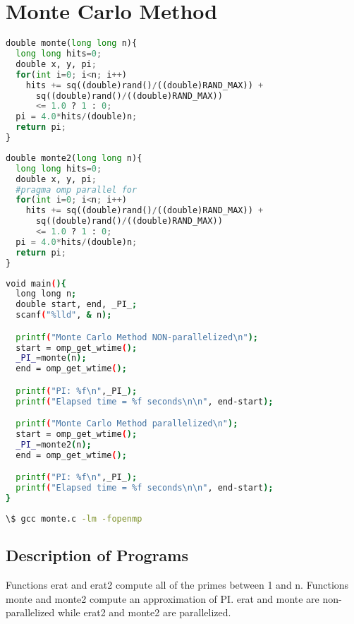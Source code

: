 \documentclass[12pt]{article}
\begin{document}
\section*{Monte Carlo Method}
\begin{lstlisting}[frame=single,language=Python,caption=Non-parallelized Monte Carlo Method (monte.c) \label{code:monte-carlo-nonparallelized}]
double monte(long long n){
  long long hits=0; 
  double x, y, pi;
  for(int i=0; i<n; i++)
    hits += sq((double)rand()/((double)RAND_MAX)) + 
      sq((double)rand()/((double)RAND_MAX)) 
      <= 1.0 ? 1 : 0;
  pi = 4.0*hits/(double)n;
  return pi;
}
\end{lstlisting}
\begin{lstlisting}[frame=single,language=Python,caption=Parallelized Monte Carlo Method (monte.c) \label{code:monte-carlo-parallelized}]
double monte2(long long n){
  long long hits=0; 
  double x, y, pi;
  #pragma omp parallel for
  for(int i=0; i<n; i++)
    hits += sq((double)rand()/((double)RAND_MAX)) + 
      sq((double)rand()/((double)RAND_MAX)) 
      <= 1.0 ? 1 : 0;
  pi = 4.0*hits/(double)n;
  return pi;
}
\end{lstlisting}
\newpage
\begin{lstlisting}[frame=single,language=Bash,caption=Measuring Runtime Performance (monte.c) \label{code:monte-carlo-runtime}]
void main(){
  long long n;
  double start, end, _PI_;
  scanf("%lld", & n);

  printf("Monte Carlo Method NON-parallelized\n");
  start = omp_get_wtime();
  _PI_=monte(n);
  end = omp_get_wtime();

  printf("PI: %f\n",_PI_);
  printf("Elapsed time = %f seconds\n\n", end-start);

  printf("Monte Carlo Method parallelized\n");
  start = omp_get_wtime();
  _PI_=monte2(n);
  end = omp_get_wtime();

  printf("PI: %f\n",_PI_);
  printf("Elapsed time = %f seconds\n\n", end-start);
}
\end{lstlisting}
\begin{lstlisting}[frame=single,language=Bash,caption=Output in Terminal (monte.c) \label{code:monte-carlo-terminal-output}]
\$ gcc monte.c -lm -fopenmp
\end{lstlisting}

\newpage
\subsection*{Description of Programs}
Functions erat and erat2 compute all of the primes between 1 and n. 
Functions monte and monte2 compute an approximation of PI.
erat and monte are non-parallelized while erat2 and monte2 are parallelized.
\end{document}
